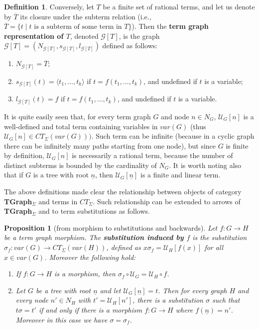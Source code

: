 \documentclass{eptcs}
\theoremstyle{plain}
\newtheorem{proposition}[theorem]{Proposition}
\theoremstyle{definition}
\newtheorem{definition}[theorem]{Definition}
\newcommand{\varnodes}[1]{var(#1)}
\begin{document}
\begin{definition}
Conversely, let $T$ be a finite set of rational terms, and let us 
denote by $\overline{T}$ its
closure under the subterm relation (i.e., $\overline{T} = \{t \mid t 
\mbox{ is
a subterm of some term in $T$}\}$). Then the 
{\bf term graph representation of $T$}, denoted $\mathcal{G}[T]$, is the 
graph  
$\mathcal{G}[T] = (N_{\mathcal{G}[T]}, s_{\mathcal{G}[T]}, l_{\mathcal{G}[T]})$ 
defined as 
follows:
\begin{enumerate}
\item
$N_{\mathcal{G}[T]} = \overline{T};$
\item 
$s_{\mathcal{G}[T]}(t) = \langle t_1, \ldots, t_k\rangle$ \quad
if $t = f(t_1, \ldots, t_k)$, and undefined if $t$ is a variable;
\item 
$l_{\mathcal{G}[T]}(t) = f$ \quad
if $t = f(t_1, \ldots, t_k)$, and undefined if $t$ is a variable.
\end{enumerate}
\end{definition}

It is quite easily seen that, for every term graph $G$ and 
node $n \in N_G$, $\mathcal{U}_G[n]$ is a well-defined and total term 
containing
variables in $\varnodes{G}$ (thus $\mathcal{U}_G[n] \in 
CT_\Sigma(\varnodes{G}))$.
Such term can be infinite (because in a cyclic
graph there can be infinitely many paths starting from one node), but 
since $G$ is finite by definition, $\mathcal{U}_G[n]$ is
necessarily a rational term, because
the number of distinct subterms is bounded by the 
cardinality of $N_G$. It is worth noting also that if $G$ is a tree 
with
root $\underline{n}$, then $\mathcal{U}_G[\underline{n}]$ is a finite and 
linear 
term.




The above definitions made clear the relationship between objects of
category {\bf TGraph$_\Sigma$} and terms in $CT_\Sigma$. Such 
relationship 
can be extended to arrows of {\bf TGraph$_\Sigma$} and to term 
substitutions 
as follows.

\begin{proposition}
[from morphism to substitutions and backwards]
\label{pr:morphisms}
Let  $f: G \rightarrow
H$ be a term graph morphism. The {\bf substitution induced by $f$} is 
the  
substitution $\sigma_f: \varnodes{G}
\rightarrow CT_\Sigma(\varnodes{H})$, defined as $x\sigma_f = 
\mathcal{U}_H[f(x)]$ for all $x \in \varnodes{G}$. Moreover the following 
hold:
\begin{enumerate}
\item
If $f: G \rightarrow H$ is a morphism, then 
$\sigma_f\circ \mathcal{U}_G = \mathcal{U}_H\circ f$.

\item
Let $G$ be a tree with root $\underline{n}$ and let $\mathcal{
U}_G[\underline{n}]=t$. Then for every
graph $H$ and every node $n'\in N_{H}$ with 
$t'=\mathcal{U}_{H}[n']$,
there is a substitution $\sigma$ such that $t\sigma=t'$ {\em if and 
only if}
there is a morphism $f: G\rightarrow H$ where
$f(\underline{n})=n'$. Moreover in  
this
case we have $\sigma = \sigma_f$.
\end{enumerate}
\end{proposition} 
\end{document}
